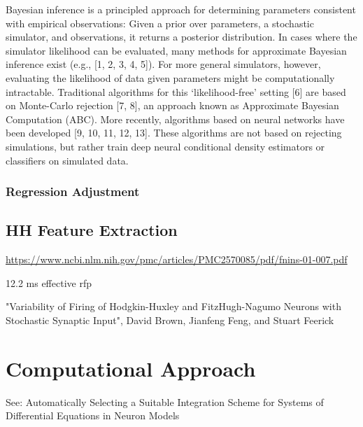 Bayesian inference is a principled approach for determining parameters consistent with empirical observations: Given a prior over parameters, a stochastic simulator, and observations, it returns a posterior distribution. In cases where the simulator likelihood can be evaluated, many methods for approximate Bayesian
inference exist (e.g., [1, 2, 3, 4, 5]). For more general simulators, however, evaluating the likelihood of data
given parameters might be computationally intractable. Traditional algorithms for this ‘likelihood-free’
setting [6] are based on Monte-Carlo rejection [7, 8], an approach known as Approximate Bayesian Computation (ABC). More recently, algorithms based on neural networks have been developed [9, 10, 11, 12, 13].
These algorithms are not based on rejecting simulations, but rather train deep neural conditional density estimators or classifiers on simulated data. 

\subsection{Regression Adjustment}\label{sec:reg_adjust}

\section{HH Feature Extraction}\label{sec:hh_feature_extract}

\url{https://www.ncbi.nlm.nih.gov/pmc/articles/PMC2570085/pdf/fnins-01-007.pdf}



12.2 ms effective rfp

"Variability of Firing of Hodgkin-Huxley and FitzHugh-Nagumo Neurons with Stochastic Synaptic Input", David Brown, Jianfeng Feng, and Stuart Feerick 

\chapter{Computational Approach}\label{chap:comp_approach}

See: Automatically Selecting a Suitable Integration Scheme for Systems of Differential Equations in Neuron Models

